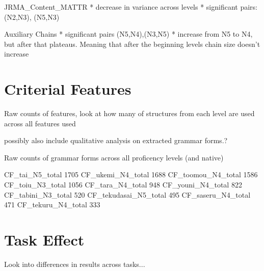 JRMA_Content_MATTR
    * decrease in variance across levels
    * significant pairs: (N2,N3), (N5,N3)

Auxiliary Chains
    * significant pairs (N5,N4),(N3,N5)
    * increase from N5 to N4, but after that plateaus. Meaning that after the beginning levels chain size doesn't
    increase
\section{Criterial Features}
Raw counts of features, 
look at how many of structures from each level are used across all features used


possibly also include qualitative analysis on extracted grammar forms.?

Raw counts of grammar forms across all proficency levels (and native)

CF_tai_N5_total          1705
CF_ukemi_N4_total        1688
CF_toomou_N4_total       1586
CF_toiu_N3_total         1056
CF_tara_N4_total          948
CF_youni_N4_total         822
CF_tabini_N3_total        520
CF_tekudasai_N5_total     495
CF_saseru_N4_total        471
CF_tekuru_N4_total        333

\section{Task Effect}
Look into differences in results across tasks...